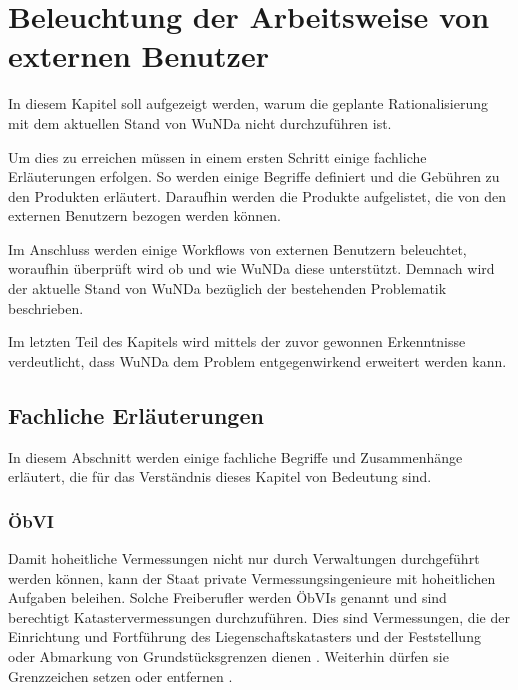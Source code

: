 \chapter{Beleuchtung der Arbeitsweise von externen Benutzer}

In diesem Kapitel soll aufgezeigt werden, warum die geplante Rationalisierung mit dem aktuellen Stand von \ac{WuNDa} nicht durchzuführen ist.

Um dies zu erreichen müssen in einem ersten Schritt einige fachliche Erläuterungen erfolgen. So werden einige Begriffe definiert und die Gebühren zu den Produkten erläutert. Daraufhin  werden die Produkte aufgelistet, die von den externen Benutzern bezogen werden können.

Im Anschluss werden einige Workflows von externen Benutzern beleuchtet, woraufhin überprüft wird ob und wie \ac{WuNDa} diese unterstützt. Demnach wird der aktuelle Stand von \ac{WuNDa} bezüglich der bestehenden Problematik beschrieben.

Im letzten Teil des Kapitels wird mittels der zuvor gewonnen Erkenntnisse verdeutlicht, dass \ac{WuNDa} dem Problem entgegenwirkend erweitert werden kann. 


\section{Fachliche Erläuterungen}
In diesem Abschnitt werden einige fachliche Begriffe und Zusammenhänge erläutert, die für das Verständnis dieses Kapitel von Bedeutung sind.

\subsection{ÖbVI}
Damit hoheitliche Vermessungen nicht nur durch Verwaltungen durchgeführt werden können, kann der Staat private Vermessungsingenieure mit hoheitlichen Aufgaben beleihen.
Solche Freiberufler werden \acfp{ÖbVI} genannt und sind berechtigt Katastervermessungen durchzuführen. Dies sind Vermessungen, die der Einrichtung und Fortführung des Liegenschaftskatasters und der Feststellung oder Abmarkung von Grundstücksgrenzen dienen \autocite[vgl.][]{bdvi-oebvi}.
Weiterhin dürfen sie Grenzzeichen setzen oder entfernen \autocite[vgl.][]{wolff-oebvi}.

